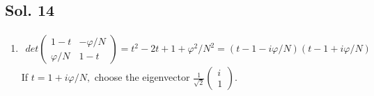 \subsection*{Sol. 14}
\begin{enumerate}
    \item \begin{align*}
    det\begin{pmatrix}
    1-t & -\varphi/N\\\varphi/N & 1-t
    \end{pmatrix} = t^2-2t+1+\varphi^2/N^2 = (t-1-i\varphi/N)(t-1+i\varphi/N)
\end{align*}
If $t = 1+i\varphi/N,$  choose the eigenvector 
$\frac{1}{\sqrt{2}}\begin{pmatrix}
    i\\1
\end{pmatrix}.$


\end{enumerate}
